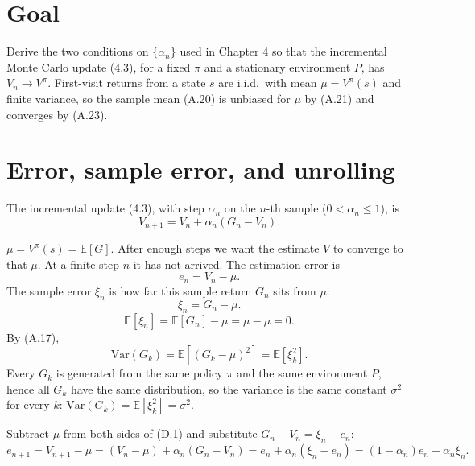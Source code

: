 \section*{Goal}

Derive the two conditions on $\{\alpha_n\}$ used in Chapter 4 so that the incremental Monte Carlo update (4.3), for a fixed $\pi$ and a stationary environment $P$, has $V_n\to V^\pi$. First-visit returns from a state $s$ are i.i.d.\ with mean $\mu=V^\pi(s)$ and finite variance, so the sample mean (A.20) is unbiased for $\mu$ by (A.21) and converges by (A.23).

\section{Error, sample error, and unrolling}

The incremental update (4.3), with step $\alpha_n$ on the $n$-th sample ($0<\alpha_n\le 1$), is
\begin{equation}
V_{n+1}=V_n+\alpha_n(G_n-V_n).
\tag{D.1}
\end{equation}

$\mu=V^\pi(s)=\mathbb{E}[G]$. After enough steps we want the estimate $V$ to converge to that $\mu$. At a finite step $n$ it has not arrived. The estimation error is
\begin{equation}
e_n=V_n-\mu.
\tag{D.2}
\end{equation}
The sample error $\xi_n$ is how far this sample return $G_n$ sits from $\mu$:
\begin{equation}
\xi_n=G_n-\mu.
\tag{D.3}
\end{equation}
\[
\mathbb{E}[\xi_n]=\mathbb{E}[G_n]-\mu=\mu-\mu=0.
\]
By (A.17),
\[
\mathrm{Var}(G_k)=\mathbb{E}[(G_k-\mu)^2]=\mathbb{E}[\xi_k^2].
\]
Every $G_k$ is generated from the same policy $\pi$ and the same environment $P$, hence all $G_k$ have the same distribution, so the variance is the same constant $\sigma^2$ for every $k$: $\mathrm{Var}(G_k)=\mathbb{E}[\xi_k^2]=\sigma^2$.

Subtract $\mu$ from both sides of (D.1) and substitute $G_n-V_n=\xi_n-e_n$:
\begin{equation}
e_{n+1}
=
V_{n+1}-\mu
=
(V_n-\mu)+\alpha_n(G_n-V_n)
=
e_n+\alpha_n(\xi_n-e_n)
=
(1-\alpha_n)e_n+\alpha_n\xi_n.
\tag{D.4}
\end{equation}

